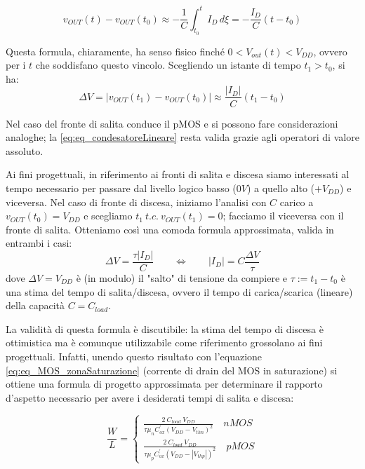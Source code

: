 \begin{equation}
v_{OUT}(t) - v_{OUT}(t_0) \approx - \frac{1}{C}\int_{t_0}^{t} I_D \, d\xi = - \frac{I_D}{C}(t - t_0)
\label{eq:eq_condensatoreSoluzioneLineare}
\end{equation}

Questa formula, chiaramente, ha senso fisico finché $0 < V_{out}(t) < V_{DD}$, ovvero per i $t$ che soddisfano questo vincolo. Scegliendo un istante di tempo $t_1 > t_0$, si ha:
\begin{equation}
\Delta V = \left | v_{OUT}(t_1) - v_{OUT}(t_0) \right | \approx \frac{\left | I_D \right | }{C}(t_1 - t_0)
\label{eq:eq_condesatoreLineare}
\end{equation}

Nel caso del fronte di salita conduce il pMOS e si possono fare considerazioni analoghe; la \ref{eq:eq_condesatoreLineare} resta valida grazie agli operatori di valore assoluto.

Ai fini progettuali, in riferimento ai fronti di salita e discesa siamo interessati al tempo necessario per passare dal livello logico basso ($0V$) a quello alto  ($+V_{DD}$) e viceversa. Nel caso di fronte di discesa, iniziamo l'analisi con $C$ carico a $v_{OUT}(t_0) = V_{DD}$ e scegliamo $t_1 \ t.c. \ v_{OUT}(t_1) = 0$; facciamo il viceversa con il fronte di salita. Otteniamo così una comoda formula approssimata, valida in entrambi i casi:
\begin{equation}
\Delta V = \frac{\tau \left | I_D \right |}{C} \qquad \Leftrightarrow \qquad \left | I_D \right | = C \frac{\Delta V}{\tau}
\label{eq:eq_condensatoreLineareFinale}
\end{equation}
dove $\Delta V = V_{DD}$ è (in modulo) il "salto" di tensione da compiere e $\tau := t_1 - t_0$ è una stima del tempo di salita/discesa, ovvero il tempo di carica/scarica (lineare) della capacità $C = C_{load}$.

La validità di questa formula è discutibile: la stima del tempo di discesa è ottimistica ma è comunque utilizzabile come riferimento grossolano ai fini progettuali. Infatti, unendo questo risultato con l'equazione \ref{eq:eq_MOS_zonaSaturazione} (corrente di drain del MOS in saturazione) si ottiene una formula di progetto approssimata per determinare il rapporto d'aspetto necessario per avere i desiderati tempi di salita e discesa:

\begin{equation}
\frac{W}{L} =
\begin{cases}
\frac{2 \ C_{load} \ V_{DD}}{\tau \mu _{n} C^{'}_{ox} (V_{DD}-V_{thn})^2} \quad nMOS\\
\frac{2\ C_{load} \ V_{DD}}{\tau \mu _{p} C^{'}_{ox} (V_{DD}-|V_{thp}|)^2} \quad pMOS
\end{cases}
\label{eq:formulaRapportoAspetto}
\end{equation}

